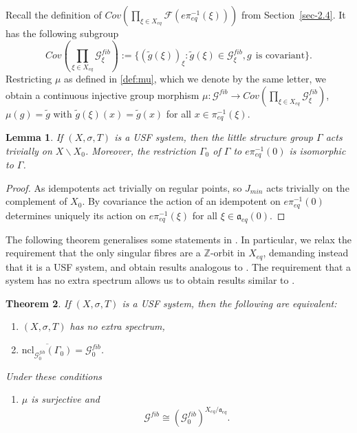 \documentclass[12pt]{amsart}
\newtheorem{theorem}{Theorem}[section]
\newtheorem{lemma}[theorem]{Lemma}
\theoremstyle{definition}
\numberwithin{equation}{section}
\newcommand{\Ff}{{\mathcal F}}
\newcommand{\Gg}{{\mathcal G}}
\newcommand{\Xe}{X_{eq}}
\newcommand{\aut}{{\mathfrak a}}
\newcommand{\aute}{\aut_{eq}}
\newcommand{\pe}{\pi_{eq}}
\begin{document}
Recall the definition of $Cov(\prod_{\xi\in \Xe} \Ff(e\pe^{-1}(\xi)))$ from Section~\ref{sec-2.4}. 
It has the following subgroup
$$Cov(\prod_{\xi\in \Xe} \Gg^{fib}_\xi):=\{(\tilde g(\xi))_\xi:\tilde g(\xi)\in \Gg^{fib}_\xi, g\:\:\mbox{is covariant}\}.$$
Restricting $\mu$ as defined in \eqref{def:mu}, which we denote by the same letter, we obtain a continuous injective group morphism
$\mu:\Gg^{fib} \to Cov(\prod_{\xi\in \Xe} \Gg^{fib}_\xi)$, 
$\mu(g) = \tilde g$ with $\tilde g(\xi)(x) = \tilde g(x)$ for all $x\in \pe^{-1}(\xi)$. 
\begin{lemma}\label{lem-little}
If $(X,\sigma,T)$ is a USF system, then the  little structure group $\Gamma$ acts trivially on $X\backslash X_0$. Moreover, the restriction $\Gamma_0$ of $\Gamma$ to $e\pe^{-1}(0)$ 
is isomorphic to $\Gamma$.
\end{lemma}
\begin{proof}
As idempotents act trivially on regular points, so  $J_{min}$ acts trivially on the complement of $X_0$. By covariance the action of an idempotent on $e\pe^{-1}(0)$ determines uniquely its action on $e\pe^{-1}(\xi)$ for all $\xi \in \aute(0)$.
\end{proof}
The following theorem generalises some statements in 
\cite[Section 3]{ESBS}. In particular, we relax the requirement that the only singular fibres are a  $\mathbb Z$-orbit in $\Xe$,  demanding instead that it is a USF system, and obtain results analogous to \cite[Corollary 3.7]{ESBS}. The requirement that a system has no extra spectrum allows us to obtain results similar to \cite[Thm 3.14]{ESBS}. 

\begin{theorem} \label{thm-prod}
If $(X,\sigma,T)$ is a USF system, then the following are equivalent:
\begin{enumerate}
\item $(X,\sigma,T)$ has no extra spectrum,
\item 
$  \overline{\text{ncl}_{\Gg^{fib}_0}(\Gamma_0)} =\Gg^{fib}_0$.
\end{enumerate}
Under these conditions
\begin{enumerate}
\item[(3)] $\mu$ is surjective and
$$\Gg^{fib} \cong    (\Gg^{fib}_0)^{\Xe/\aute} .  $$
\end{enumerate}
\end{theorem}
\end{document}
